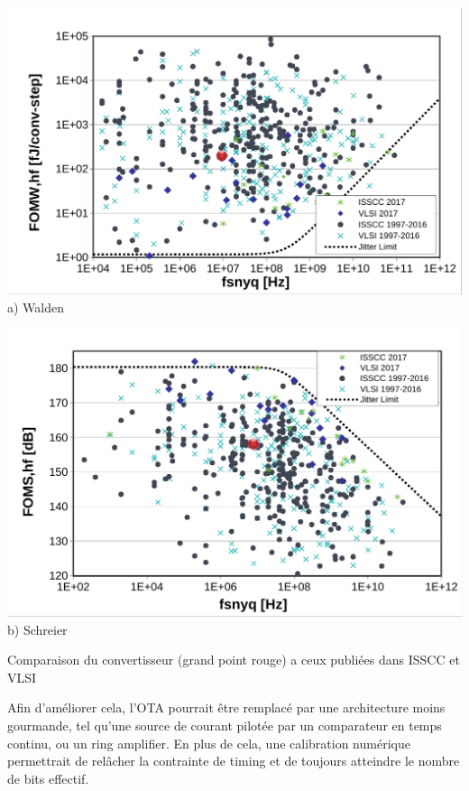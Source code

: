 \begin{mdframed}[linecolor=Prune,linewidth=1]
\begin{center}
    \centering
    \begin{minipage}[b]{0.49\linewidth}
        \centering
        \includegraphics[width=\textwidth]{Abstract/Figs/WaldenFoM-a.pdf}
        a) Walden
    \end{minipage}
    \begin{minipage}[b]{0.49\linewidth}
        \centering
        \includegraphics[width=\textwidth]{Abstract/Figs/SchreierFoM-a.pdf}
        b) Schreier
    \end{minipage}
    \caption[]{Comparaison du convertisseur (grand point rouge) a ceux publiées dans ISSCC et VLSI}
	\label{fig:fom-fr}
\end{center}

Afin d'améliorer cela, l'OTA pourrait être remplacé par une architecture moins gourmande, tel qu'une source de courant pilotée par un comparateur en temps continu, ou un ring amplifier. En plus de cela, une calibration numérique permettrait de relâcher la contrainte de timing et de toujours atteindre le nombre de bits effectif.

\end{mdframed}

